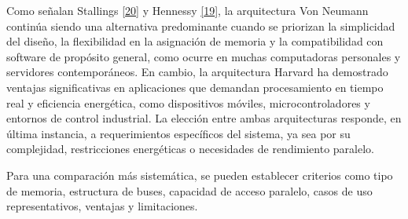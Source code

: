 \documentclass[12pt,oneside]{templates/unerthesis}
\begin{document}
Como señalan Stallings \protect\hyperlink{ref-stallings_computer_2021}{{[}20{]}} y Hennessy \protect\hyperlink{ref-hennessy2017computer}{{[}19{]}}, la arquitectura Von Neumann continúa siendo una alternativa predominante cuando se priorizan la simplicidad del diseño, la flexibilidad en la asignación de memoria y la compatibilidad con software de propósito general, como ocurre en muchas computadoras personales y servidores contemporáneos. En cambio, la arquitectura Harvard ha demostrado ventajas significativas en aplicaciones que demandan procesamiento en tiempo real y eficiencia energética, como dispositivos móviles, microcontroladores y entornos de control industrial. La elección entre ambas arquitecturas responde, en última instancia, a requerimientos específicos del sistema, ya sea por su complejidad, restricciones energéticas o necesidades de rendimiento paralelo.

Para una comparación más sistemática, se pueden establecer criterios como tipo de memoria, estructura de buses, capacidad de acceso paralelo, casos de uso representativos, ventajas y limitaciones.

\begin{table}[!h]
\centering
\caption{\label{tab:unnamed-chunk-1}Cuadro comparativo entre arquitecturas Von Neumann y Harvard}
\centering
{}
\end{table}
\end{document}

